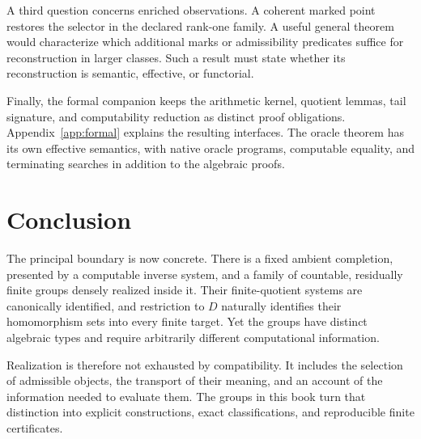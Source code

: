 A third question concerns enriched observations. A coherent marked point restores the selector in the declared rank-one family. A useful general theorem would characterize which additional marks or admissibility predicates suffice for reconstruction in larger classes. Such a result must state whether its reconstruction is semantic, effective, or functorial.

Finally, the formal companion keeps the arithmetic kernel, quotient lemmas, tail signature, and computability reduction as distinct proof obligations. Appendix~\ref{app:formal} explains the resulting interfaces. The oracle theorem has its own effective semantics, with native oracle programs, computable equality, and terminating searches in addition to the algebraic proofs.

\section{Conclusion}
The principal boundary is now concrete. There is a fixed ambient completion, presented by a computable inverse system, and a family of countable, residually finite groups densely realized inside it. Their finite-quotient systems are canonically identified, and restriction to $D$ naturally identifies their homomorphism sets into every finite target. Yet the groups have distinct algebraic types and require arbitrarily different computational information.

Realization is therefore not exhausted by compatibility. It includes the selection of admissible objects, the transport of their meaning, and an account of the information needed to evaluate them. The groups in this book turn that distinction into explicit constructions, exact classifications, and reproducible finite certificates.
